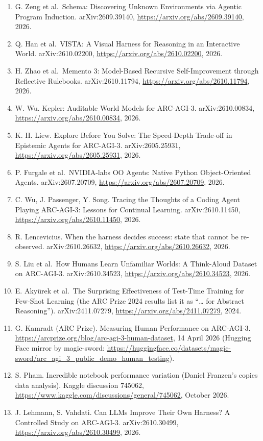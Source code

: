 \documentclass[
  11pt,
]{article}
\begin{document}
\begin{enumerate}
  A. Fox et al.~PRO-LONG: Programmatic Memory Enables Long-Horizon
  Reasoning. arXiv:2607.20064, \url{https://arxiv.org/abs/2607.20064},
  2026.
\item
  G. Zeng et al.~Schema: Discovering Unknown Environments via Agentic
  Program Induction. arXiv:2609.39140,
  \url{https://arxiv.org/abs/2609.39140}, 2026.
\item
  Q. Han et al.~VISTA: A Visual Harness for Reasoning in an Interactive
  World. arXiv:2610.02200, \url{https://arxiv.org/abs/2610.02200}, 2026.
\item
  H. Zhao et al.~Memento 3: Model-Based Recursive Self-Improvement
  through Reflective Rulebooks. arXiv:2610.11794,
  \url{https://arxiv.org/abs/2610.11794}, 2026.
\item
  W. Wu. Kepler: Auditable World Models for ARC-AGI-3. arXiv:2610.00834,
  \url{https://arxiv.org/abs/2610.00834}, 2026.
\item
  K. H. Liew. Explore Before You Solve: The Speed-Depth Trade-off in
  Epistemic Agents for ARC-AGI-3. arXiv:2605.25931,
  \url{https://arxiv.org/abs/2605.25931}, 2026.
\item
  P. Furgale et al.~NVIDIA-labs OO Agents: Native Python Object-Oriented
  Agents. arXiv:2607.20709, \url{https://arxiv.org/abs/2607.20709},
  2026.
\item
  C. Wu, J. Passenger, Y. Song. Tracing the Thoughts of a Coding Agent
  Playing ARC-AGI-3: Lessons for Continual Learning. arXiv:2610.11450,
  \url{https://arxiv.org/abs/2610.11450}, 2026.
\item
  R. Lencevicius. When the harness decides success: state that cannot be
  re-observed. arXiv:2610.26632, \url{https://arxiv.org/abs/2610.26632},
  2026.
\item
  S. Liu et al.~How Humans Learn Unfamiliar Worlds: A Think-Aloud
  Dataset on ARC-AGI-3. arXiv:2610.34523,
  \url{https://arxiv.org/abs/2610.34523}, 2026.
\item
  E. Akyürek et al.~The Surprising Effectiveness of Test-Time Training
  for Few-Shot Learning (the ARC Prize 2024 results list it as
  ``\ldots{} for Abstract Reasoning''). arXiv:2411.07279,
  \url{https://arxiv.org/abs/2411.07279}, 2024.
\item
  G. Kamradt (ARC Prize). Measuring Human Performance on ARC-AGI-3.
  \url{https://arcprize.org/blog/arc-agi-3-human-dataset}, 14 April 2026
  (Hugging Face mirror by magic-sword:
  \url{https://huggingface.co/datasets/magic-sword/arc_agi_3_public_demo_human_testing}).
\item
  S. Pham. Incredible notebook performance variation (Daniel Franzen's
  copies data analysis). Kaggle discussion 745062,
  \url{https://www.kaggle.com/discussions/general/745062}, October 2026.
\item
  J. Lehmann, S. Vahdati. Can LLMs Improve Their Own Harness? A
  Controlled Study on ARC-AGI-3. arXiv:2610.30499,
  \url{https://arxiv.org/abs/2610.30499}, 2026.
\end{enumerate}
\end{document}
